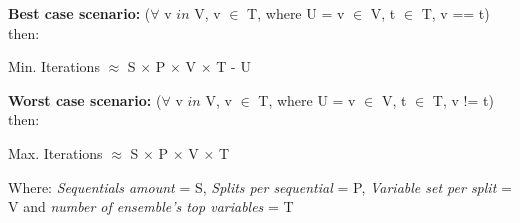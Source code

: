 \textbf{Best case scenario:} ($\forall$ v $in$ V, v $\in$ T, where U = v $\in$ V, t $\in$ T, v == t) then:
\begin{center}
Min. Iterations $\approx$ S $\times$ P $\times$ V $\times$ T - U\\    
\end{center}

\textbf{Worst case scenario:} ($\forall$ v $in$ V, v $\in$ T, where U = v $\in$ V, t $\in$ T, v != t) then:
\begin{center}
Max. Iterations $\approx$ S $\times$ P $\times$ V $\times$ T\\    
\end{center}


Where: \textit{Sequentials amount} = S, \textit{Splits per sequential} = P, \textit{Variable set per split} = V and \textit{number of ensemble’s top variables} = T

\begin{table}[]
\centering
{}
\label{tbl:swapvars}
\caption{weak rivalry relation matrix. Row indexes include the removed variable from the original set and column names contain the variables they have been swapped for. The relation value summarises the number of times a swap has resulted in a score > 0.75 and the weak rivalry score > 0.95.}
\end{table}

